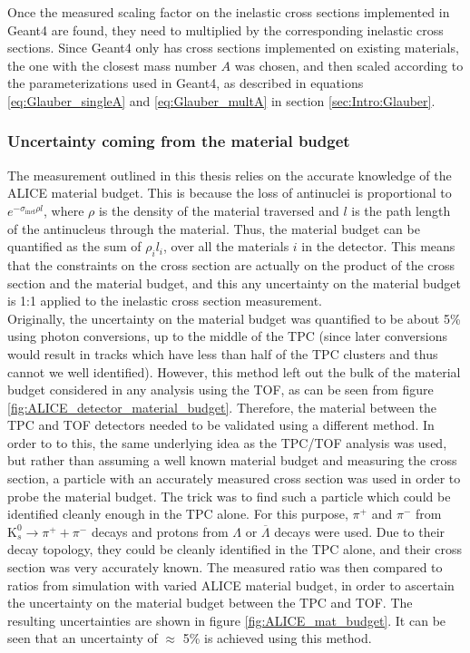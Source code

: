 Once the measured scaling factor on the inelastic cross sections implemented in Geant4 are found, they need to multiplied by the corresponding inelastic cross sections. Since Geant4 only has cross sections implemented on existing materials, the one with the closest mass number $A$ was chosen, and then scaled according to the parameterizations used in Geant4, as described in equations \ref{eq:Glauber_singleA} and \ref{eq:Glauber_multA} in section \ref{sec:Intro:Glauber}.

\subsubsection{Uncertainty coming from the material budget}
The measurement outlined in this thesis relies on the accurate knowledge of the ALICE material budget. This is because the loss of antinuclei is proportional to $e^{-\sigma_\mathrm{inel} \rho l}$, where $\rho$ is the density of the material traversed and $l$ is the path length of the antinucleus through the material. Thus, the material budget can be quantified as the sum of $\rho_i l_i$, over all the materials $i$ in the detector. This means that the constraints on the cross section are actually on the product of the cross section and the material budget, and this any uncertainty on the material budget is 1:1 applied to the inelastic cross section measurement. \\

Originally, the uncertainty on the material budget was quantified to be about 5\% using photon conversions\cite{photon_conversion}, up to the middle of the TPC (since later conversions would result in tracks which have less than half of the TPC clusters and thus cannot we well identified). However, this method left out the bulk of the material budget considered in any analysis using the TOF, as can be seen from figure \ref{fig:ALICE_detector_material_budget}. Therefore, the material between the TPC and TOF detectors needed to be validated using a different method. In order to to this, the same underlying idea as the TPC/TOF analysis was used, but rather than assuming a well known material budget and measuring the cross section, a particle with an accurately measured cross section was used in order to probe the material budget. The trick was to find such a particle which could be identified cleanly enough in the TPC alone. For this purpose, $\pi^+$ and $\pi^-$ from $\mathrm{K}_s^0 \rightarrow \pi^+ + \pi^-$ decays and protons from $\Lambda$ or $\overline{\Lambda}$ decays were used\cite{ALICE-PUBLIC-2022-002}. Due to their decay topology, they could be cleanly identified in the TPC alone, and their cross section was very accurately known. The measured ratio was then compared to ratios from simulation with varied ALICE material budget, in order to ascertain the uncertainty on the material budget between the TPC and TOF. The resulting uncertainties are shown in figure \ref{fig:ALICE_mat_budget}. It can be seen that an uncertainty of $\approx$ 5\% is achieved using this method. \\

